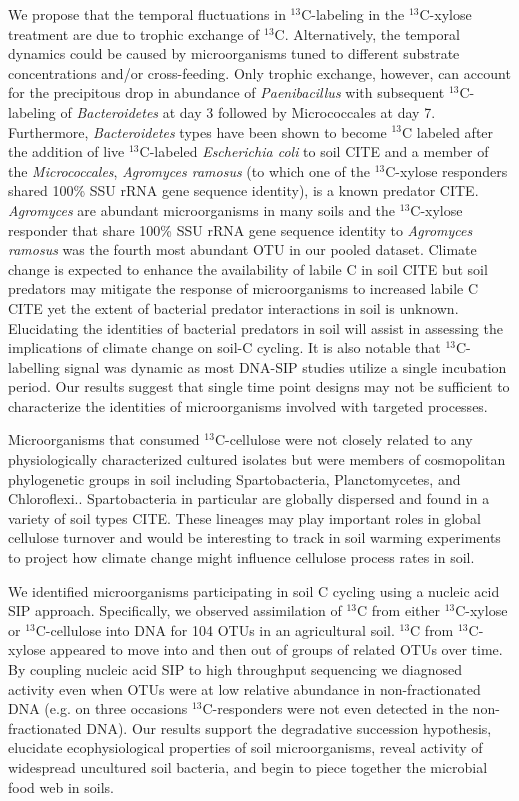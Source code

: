We propose that the temporal fluctuations in $^{13}$C-labeling in the
$^{13}$C-xylose treatment are due to trophic exchange of $^{13}$C.
Alternatively, the temporal dynamics could be caused by microorganisms tuned to
different substrate concentrations and/or cross-feeding. Only trophic exchange,
however, can account for the precipitous drop in abundance of
\textit{Paenibacillus} with subsequent $^{13}$C-labeling of \textit{Bacteroidetes} at
day 3 followed by Micrococcales at day 7.  Furthermore, \textit{Bacteroidetes} types
have been shown to become $^{13}$C labeled after the addition of live
$^{13}$C-labeled \textit{Escherichia coli} to soil CITE and a member of the
\textit{Micrococcales}, \textit{Agromyces ramosus} (to which one of the $^{13}$C-xylose
responders shared 100\% SSU rRNA gene sequence identity), is a known predator
CITE. \textit{Agromyces} are abundant microorganisms in many soils and the
$^{13}$C-xylose responder that share 100\% SSU rRNA gene sequence identity to
\textit{Agromyces ramosus} was the fourth most abundant OTU in our pooled dataset.
Climate change is expected to enhance the availability of labile C in soil CITE
but soil predators may mitigate the response of microorganisms to increased
labile C CITE yet the extent of bacterial predator interactions in soil is
unknown. Elucidating the identities of bacterial predators in soil will assist in assessing
the implications of climate change on soil-C cycling. It is also notable that
$^{13}$C-labelling signal was dynamic as most DNA-SIP studies utilize a single
incubation period. Our results suggest that single time point designs may not
be sufficient to characterize the identities of microorganisms involved with
targeted processes.

Microorganisms that consumed $^{13}$C-cellulose were not closely related to
any physiologically characterized cultured isolates but were members of cosmopolitan
phylogenetic groups in soil including Spartobacteria, Planctomycetes, and
Chloroflexi.. Spartobacteria in particular are globally dispersed and found in
a variety of soil types CITE. These lineages may play important roles in global
cellulose turnover and would be interesting to track in soil warming
experiments to project how climate change might influence cellulose process
rates in soil.

We identified microorganisms participating in soil C cycling using a nucleic
acid SIP approach. Specifically, we observed assimilation of $^{13}$C from
either $^{13}$C-xylose or $^{13}$C-cellulose into DNA for 104 OTUs in an 
agricultural soil. $^{13}$C from $^{13}$C-xylose appeared to
move into and then out of groups of related OTUs over time. By coupling nucleic
acid SIP to high throughput sequencing we diagnosed activity even when
OTUs were at low relative abundance in non-fractionated DNA (e.g. on three
occasions $^{13}$C-responders were not even detected in the non-fractionated DNA).
Our results support the degradative succession hypothesis, elucidate
ecophysiological properties of soil microorganisms, reveal activity of
widespread uncultured soil bacteria, and begin to piece together the microbial
food web in soils. 

